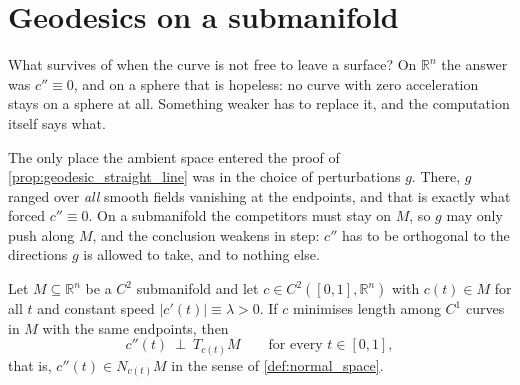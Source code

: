
\section{Geodesics on a submanifold}
\label{sec:geodesics_on_submanifolds}

What survives of  when the curve is not free to leave a surface? On
$\mathbb{R}^n$ the answer was $c'' \equiv 0$, and on a sphere that is hopeless: no curve with
zero acceleration stays on a sphere at all. Something weaker has to replace it, and the
computation itself says what.

The only place the ambient space entered the proof of \cref{prop:geodesic_straight_line} was in
the choice of perturbations $g$. There, $g$ ranged over \emph{all} smooth fields vanishing at the
endpoints, and that is exactly what forced $c'' \equiv 0$. On a submanifold the competitors must
stay on $M$, so $g$ may only push along $M$, and the conclusion weakens in step: $c''$ has to be
orthogonal to the directions $g$ is allowed to take, and to nothing else.

\begin{proposition}
\label{prop:geodesic_equation_submanifold}
Let $M \subseteq \mathbb{R}^n$ be a $C^2$ submanifold and let $c \in C^2([0,1],\mathbb{R}^n)$ with
$c(t) \in M$ for all $t$ and constant speed $\lvert c'(t)\rvert \equiv \lambda > 0$. If $c$
minimises length among $C^1$ curves in $M$ with the same endpoints, then
\[c''(t) \ \perp\ T_{c(t)}M \qquad \text{for every } t \in [0,1],\]
that is, $c''(t) \in N_{c(t)}M$ in the sense of \cref{def:normal_space}.
\end{proposition}

